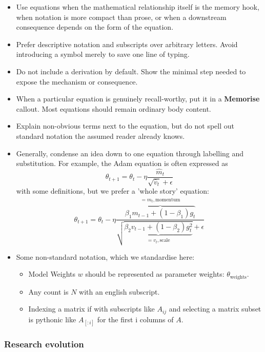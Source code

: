 \begin{itemize}
    \item Use equations when the mathematical relationship itself is the memory hook, when notation is more compact than prose, or when a downstream consequence depends on the form of the equation.
    \item Prefer descriptive notation and subscripts over arbitrary letters. Avoid introducing a symbol merely to save one line of typing.
    \item Do not include a derivation by default. Show the minimal step needed to expose the mechanism or consequence.
    \item When a particular equation is genuinely recall-worthy, put it in a \textbf{Memorise} callout. Most equations should remain ordinary body content.
    \item Explain non-obvious terms next to the equation, but do not spell out standard notation the assumed reader already knows.
    \item Generally, condense an idea down to one equation through labelling and substitution. 
    For example, the Adam equation is often expressed as 
    \[
        \theta_{t+1}=\theta_t-\eta\frac{\hat m_t}{\sqrt{\hat v_t}+\epsilon}
    \]
    with some definitions, but we prefer a 'whole story' equation:
    \[
        \theta_{t+1}
        =
        \theta_t-\eta
        \frac{
        \overbrace{\beta_1m_{t-1}+(1-\beta_1)g_t}
        ^{\substack{= m_t , \text{momentum}}}
        }{
        \sqrt{
        \underbrace{\beta_2v_{t-1}+(1-\beta_2)g_t^{2}}
        _{\substack{= v_t , \text{scale}}}
        }+\epsilon
        }
    \]
    \item Some non-standard notation, which we standardise here:
    \begin{itemize}
        \item Model Weights $w$ should be represented as parameter weights: $\theta_{\text{weights}}$.
        \item Any count is $N$ with an english subscript.
        \item Indexing a matrix if with subscripts like $A_{ij}$ and selecting a matrix subset is pythonic like $A_{[:i]}$ for the first i columns of $A$.
    \end{itemize}
    
    
\end{itemize}

\subsubsection*{Research evolution}

